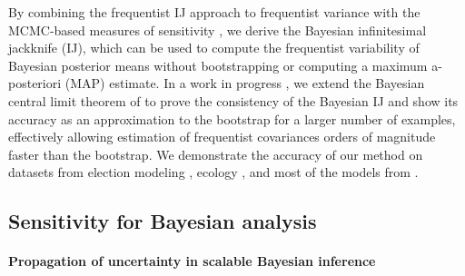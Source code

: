 By combining the frequentist IJ \citep{jaeckel:1972:infinitesimal,
shao:2012:jackknife, giordano:2019:ij} approach to frequentist variance with the
MCMC-based measures of sensitivity \citep{gustafson:2012:localrobustnessbook,
giordano:2018:covariances}, we derive the Bayesian infinitesimal jackknife (IJ),
which can be used to compute the frequentist variability of Bayesian posterior
means without bootstrapping or computing a maximum a-posteriori (MAP) estimate.
In a work in progress \citep{giordano:2020:bayesij}, we extend the Bayesian
central limit theorem of \citet{lehman:1983:pointestimation,
kass:1990:posteriorexpansions} to prove the consistency of the Bayesian IJ and
show its accuracy as an approximation to the bootstrap for a larger number of
examples, effectively allowing estimation of frequentist covariances orders of
magnitude faster than the bootstrap.  We demonstrate the accuracy of our method
on datasets from election modeling \citep{economist:2020:election}, ecology
\citep{kery:2011:bayesian}, and most of the models from \citep{gelman:2006:arm,
stan-examples:2017}.






\subsection*{Sensitivity for Bayesian analysis}


\paragraph{Propagation of uncertainty in scalable Bayesian inference}


